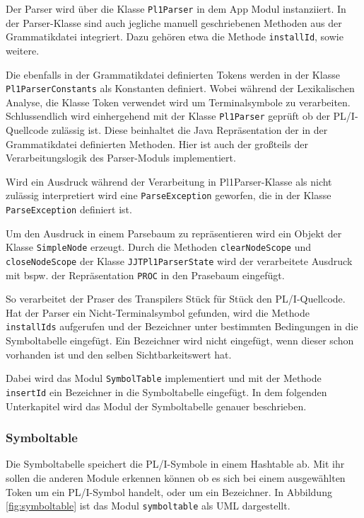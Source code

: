 Der Parser wird über die Klasse \verb+Pl1Parser+ in dem App Modul instanziiert. In der Parser-Klasse sind auch jegliche manuell geschriebenen Methoden aus der Grammatikdatei integriert. 
Dazu gehören etwa die Methode \verb+installId+, sowie weitere. 

Die ebenfalls in der Grammatikdatei definierten Tokens werden in der Klasse \verb+Pl1ParserConstants+ als Konstanten definiert. Wobei während der Lexikalischen Analyse, die Klasse Token verwendet wird um Terminalsymbole zu verarbeiten. 
Schlussendlich wird einhergehend mit der Klasse \verb+Pl1Parser+ geprüft ob der PL/I-Quellcode zulässig ist. 
Diese beinhaltet die Java Repräsentation der in der Grammatikdatei definierten Methoden. Hier ist auch der großteils der Verarbeitungslogik des Parser-Moduls implementiert.

Wird ein Ausdruck während der Verarbeitung in Pl1Parser-Klasse als nicht zulässig  interpretiert wird eine \verb+ParseException+ geworfen, die in der Klasse \verb+ParseException+ definiert ist.

Um den Ausdruck in einem Parsebaum zu repräsentieren wird ein Objekt der Klasse \verb+SimpleNode+ erzeugt. Durch die Methoden \verb+clearNodeScope+ und \verb+closeNodeScope+ der Klasse \verb+JJTPl1ParserState+ wird der verarbeitete Ausdruck mit bspw. der Repräsentation \verb+PROC+ in den Prasebaum eingefügt. 

So verarbeitet der Praser des Transpilers Stück für Stück den PL/I-Quellcode. Hat der Parser ein Nicht-Terminalsymbol gefunden, wird die Methode \verb+installIds+ aufgerufen und der Bezeichner unter bestimmten Bedingungen in die Symboltabelle eingefügt. 
Ein Bezeichner wird nicht eingefügt, 
wenn dieser schon vorhanden ist und den selben Sichtbarkeitswert hat.

Dabei wird das Modul \verb+SymbolTable+ implementiert und mit der Methode \verb+insertId+ ein Bezeichner in die Symboltabelle eingefügt. In dem folgenden Unterkapitel wird das Modul der Symboltabelle genauer beschrieben. 

\subsubsection{Symboltable}
Die Symboltabelle speichert die PL/I-Symbole in einem Hashtable ab. Mit ihr sollen die anderen Module
erkennen können ob es sich bei einem ausgewählten Token um ein PL/I-Symbol handelt, oder um ein Bezeichner.
In Abbildung \ref{fig:symboltable} ist das Modul \verb+symboltable+ als \ac{UML} dargestellt.


